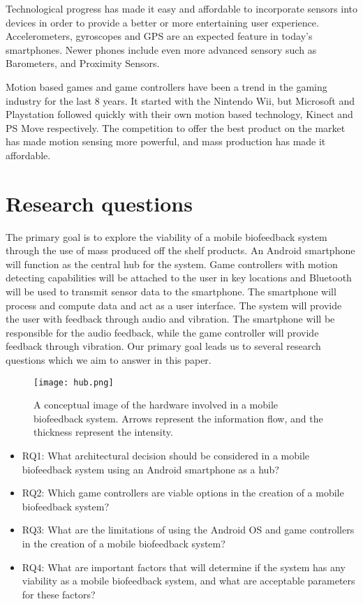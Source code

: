 Technological progress has made it easy and affordable to incorporate sensors into devices in order to provide a better or more entertaining user experience. Accelerometers, gyroscopes and GPS are an expected feature in today's smartphones. Newer phones include even more advanced sensory such as Barometers, and Proximity Sensors.

Motion based games and game controllers have been a trend in the gaming industry for the last 8 years. It started with the Nintendo Wii, but Microsoft and Playstation followed quickly with their own motion based technology, Kinect and PS Move respectively. The competition to offer the best product on the market has made motion sensing more powerful, and mass production has made it affordable.

\section{Research questions}
The primary goal is to explore the viability of a mobile biofeedback system through the use of mass produced off the shelf products. An Android smartphone will function as the central hub for the system. Game controllers with motion detecting capabilities will be attached to the user in key locations and Bluetooth will be used to transmit sensor data to the smartphone. The smartphone will process and compute data and act as a user interface. The system will provide the user with feedback through audio and vibration. The smartphone will be responsible for the audio feedback, while the game controller will provide feedback through vibration. Our primary goal leads us to several research questions which we aim to answer in this paper.

\begin{figure}[h!]
  \centering
    \texttt{[image: hub.png]}
    \caption{\footnotesize A conceptual image of the hardware involved in a mobile biofeedback system. Arrows represent the information flow, and the thickness represent the intensity.}
\end{figure}

\begin{itemize}
\item RQ1: What architectural decision should be considered in a mobile biofeedback system using an Android smartphone as a hub?
\item RQ2: Which game controllers are viable options in the creation of a mobile biofeedback system?
\item RQ3: What are the limitations of using the Android OS and game controllers in the creation of a mobile biofeedback system?
\item RQ4: What are important factors that will determine if the system has any viability as a mobile biofeedback system, and what are acceptable parameters for these factors?
\end{itemize}

